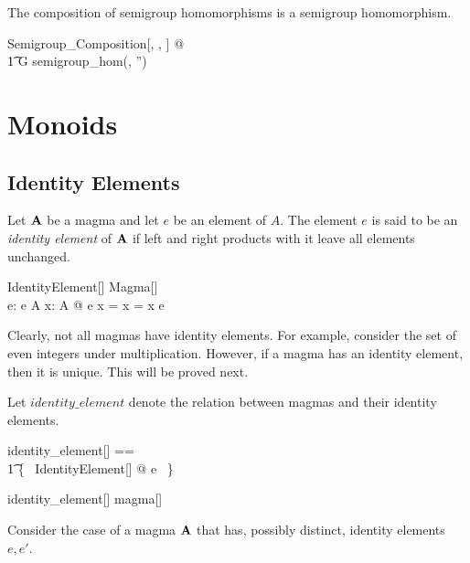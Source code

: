 \documentclass{amsart}
\begin{document}
\begin{remark}
The composition of semigroup homomorphisms is a semigroup homomorphism.

\begin{zed}
	\forall Semigroup\_Composition[\setT, \setU, \setV] @ \\
	\t1	G \in semigroup\_hom(\strucA, \strucA'')
\end{zed}

\end{remark}

\section{Monoids}

\subsection{Identity Elements}

Let $\mathbf{A}$ be a magma and let $e$ be an element of $A$.
The element $e$ is said to be an \textit{identity element} of $\mathbf{A}$ if left and right 
products with it leave all elements unchanged.

\begin{schema}{IdentityElement}[\genT]
	Magma[\genT] \\
	e: \genT
\where
	e \in A
\also
	\forall x: A @ e \opG x = x = x \opG e
\end{schema}

Clearly, not all magmas have identity elements.
For example, consider the set of even integers under multiplication.
However, if a magma has an identity element, then it is unique.
This will be proved next.

Let $identity\_element$ denote the relation between magmas and their identity elements.

\begin{zed}
	identity\_element[\genT] == \\
	\t1	\{~ IdentityElement[\genT] @ \strucA \mapsto e ~\}
\end{zed}

\begin{remark}

\begin{zed}
	identity\_element[\setT] \in magma[\setT] \rel \setT
\end{zed}

\end{remark}

Consider the case of a magma $\mathbf{A}$ that has, possibly distinct, identity elements $e, e'$.
\end{document}
